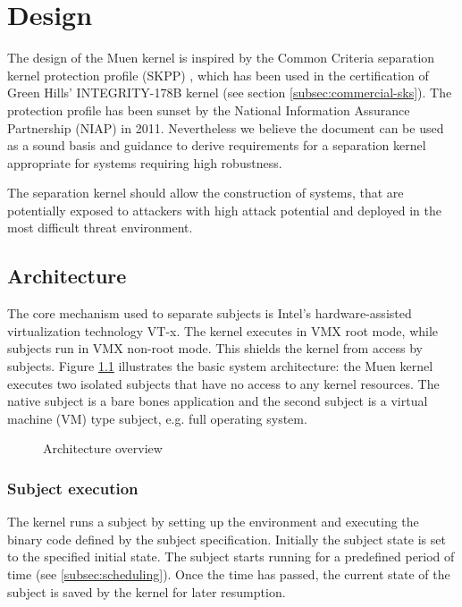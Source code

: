 \chapter{Design}
The design of the Muen kernel is inspired by the Common Criteria separation
kernel protection profile (SKPP) \cite{SKPP}, which has been used in the
certification of Green Hills' INTEGRITY-178B kernel (see section
\ref{subsec:commercial-sks}). The protection profile has been sunset by the
National Information Assurance Partnership (NIAP) in 2011. Nevertheless we
believe the document can be used as a sound basis and guidance to derive
requirements for a separation kernel appropriate for systems requiring high
robustness.

The separation kernel should allow the construction of systems, that are
potentially exposed to attackers with high attack potential and deployed in the
most difficult threat environment.







\section{Architecture}
The core mechanism used to separate subjects is Intel's hardware-assisted
virtualization technology VT-x. The kernel executes in VMX root mode, while
subjects run in VMX non-root mode. This shields the kernel from access by
subjects. Figure \ref{fig:architecture-overview} illustrates the basic system
architecture: the Muen kernel executes two isolated subjects that have no access
to any kernel resources. The native subject is a bare bones application and the
second subject is a virtual machine (VM) type subject, e.g. full operating
system.

\begin{figure}[h]
	\centering
	
	\caption{Architecture overview}
	\label{fig:architecture-overview}
\end{figure}

\subsection{Subject execution}
The kernel runs a subject by setting up the environment and executing the binary
code defined by the subject specification. Initially the subject state is set to
the specified initial state. The subject starts running for a predefined period
of time (see \ref{subsec:scheduling}). Once the time has passed, the current
state of the subject is saved by the kernel for later resumption.

